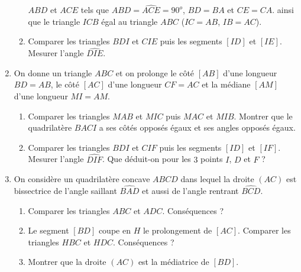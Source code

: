 \begin{enumerate}
\begin{enumerate}
$ABD$ et $ACE$ tels que $\widehat{ABD}= \widehat{ACE}=90^o$, $BD=BA$ et $CE=CA$. ainsi que le triangle $ICB$ égal au triangle $ABC$ ($IC=AB$, $IB=AC$). 
\item Comparer les triangles $BDI$ et $CIE$ puis les segments $[ID]$ et $[IE]$. 
Mesurer l'angle $\widehat{DIE}$. 
\end{enumerate}
\item On donne un triangle $ABC$ et on prolonge le côté $[AB]$ d'une longueur $BD=AB$, le côté $[AC]$ d'une longueur $CF=AC$ et la médiane $[AM]$ d'une longueur $MI=AM$.
\begin{enumerate}
\item Comparer les triangles $MAB$ et $MIC$ puis $MAC$ et $MIB$. Montrer que le quadrilatère $BACI$ a ses côtés opposés égaux et ses angles opposés égaux. 
\item Comparer les triangles $BDI$ et $CIF$ puis les segments $[ID]$ et $[IF]$. 
Mesurer l'angle $\widehat{DIF}$. Que déduit-on pour les $3$ points $I$, $D$ et $F$ ?
\end{enumerate}
\item On considère un quadrilatère concave $ABCD$ dans lequel la droite $(AC)$ est bissectrice de l'angle saillant $\widehat{BAD}$ et aussi de l'angle rentrant $\widehat{BCD}$. 
\begin{enumerate}
\item Comparer les triangles $ABC$ et $ADC$. Conséquences ? 
\item Le segment $[BD]$ coupe en $H$ le prolongement de $[AC]$. Comparer les triangles $HBC$ et $HDC$. Conséquences ? 
\item Montrer que la droite $(AC)$ est la médiatrice de $[BD]$. 
\end{enumerate}
\end{enumerate}